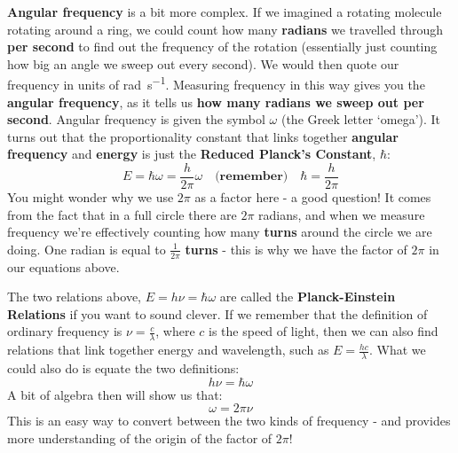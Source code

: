 \documentclass{memoir}[11pt,oneside,a4paper,openany]
\begin{document}
\textbf{Angular frequency} is a bit more complex. If we imagined a rotating molecule rotating around a ring, we could count how many \textbf{radians} we travelled through \textbf{per second} to find out the frequency of the rotation (essentially just counting how big an angle we sweep out every second). We would then quote our frequency in units of \si{\radian\per\second}. Measuring frequency in this way gives you the \textbf{angular frequency}, as it tells us \textbf{how many radians we sweep out per second}. Angular frequency is given the symbol $\omega$ (the Greek letter `omega'). It turns out that the proportionality constant that links together \textbf{angular frequency} and \textbf{energy} is just the \textbf{Reduced Planck's Constant}, $\hbar$:
\begin{equation}
	E = \hbar\omega = \frac{h}{2\pi}\omega\quad\textbf{(remember)}\quad\hbar = \frac{h}{2\pi}
\end{equation}
You might wonder why we use $2\pi$ as a factor here - a good question! It comes from the fact that in a full circle there are $2\pi$ radians, and when we measure frequency we're effectively counting how many \textbf{turns} around the circle we are doing. One radian is equal to $\frac{1}{2\pi}$ \textbf{turns} - this is why we have the factor of $2\pi$ in our equations above.

The two relations above, $E = h\nu = \hbar\omega$ are called the \textbf{Planck-Einstein Relations} if you want to sound clever. If we remember that the definition of ordinary frequency is $\nu = \frac{c}{\lambda}$, where $c$ is the speed of light, then we can also find relations that link together energy and wavelength, such as $E=\frac{hc}{\lambda}$. What we could also do is equate the two definitions:
\begin{equation}
	h\nu = \hbar\omega
\end{equation}
A bit of algebra then will show us that:
\begin{equation}
	\omega = 2\pi\nu
\end{equation}
This is an easy way to convert between the two kinds of frequency - and provides more understanding of the origin of the factor of $2\pi$!
\end{document}
